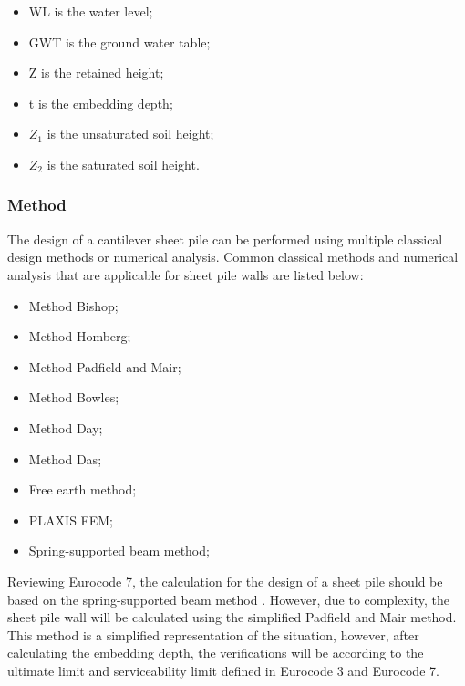 \begin{itemize}
    \item WL is the water level;
    \item GWT is the ground water table;
    \item Z is the retained height;
    \item t is the embedding depth;
    \item $Z_{1}$ is the unsaturated soil height;
    \item $Z_{2}$ is the saturated soil height.
\end{itemize}

\subsubsection{Method}

The design of a cantilever sheet pile can be performed using multiple classical design methods or numerical analysis. Common classical methods and numerical analysis that are applicable for sheet pile walls are listed below:

\begin{itemize}
  \item Method Bishop;
  \item Method Homberg;
  \item Method Padfield and Mair;
  \item Method Bowles;
  \item Method Day;
  \item Method Das;
  \item Free earth method;
  \item PLAXIS FEM;
  \item Spring-supported beam method;
\end{itemize}

Reviewing Eurocode 7, the calculation for the design of a sheet pile should be based on the spring-supported beam method \autocite{eurocodeGeotechnicalDesignStructures2025}. However, due to complexity, the sheet pile wall will be calculated using the simplified Padfield and Mair method. This method is a simplified representation of the situation, however, after calculating the embedding depth, the verifications will be according to the ultimate limit and serviceability limit defined in Eurocode 3 and Eurocode 7.


